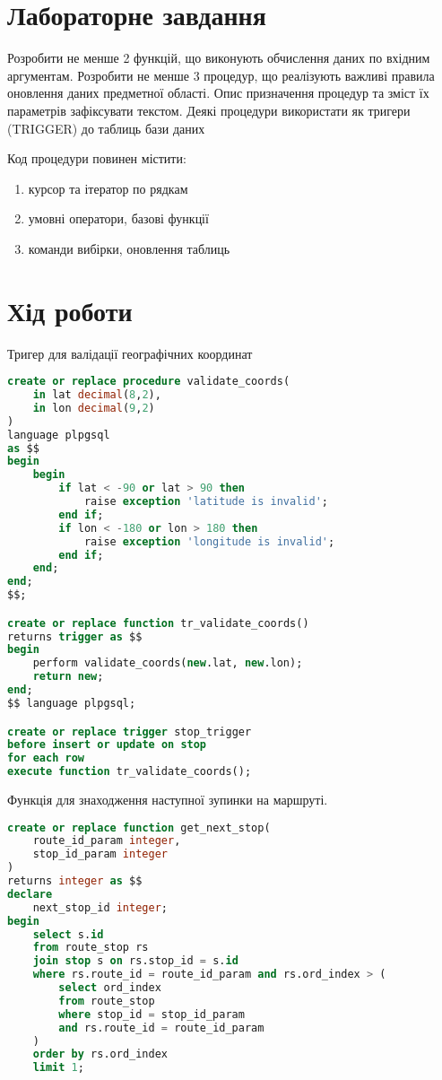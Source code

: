 \documentclass[14pt]{extreport}
\begin{document}
\begin{normalsize}
	\section*{Лабораторне завдання}
	Розробити не менше 2 функцій, що виконують обчислення даних по вхідним аргументам. Розробити не менше 3 процедур, що реалізують важливі правила оновлення даних предметної області. Опис призначення процедур та зміст їх параметрів зафіксувати текстом. Деякі процедури використати як тригери (TRIGGER) до таблиць бази даних
	
	Код процедури повинен містити:
	\begin{enumerate}
		\item курсор та ітератор по рядкам
		\item умовні оператори, базові функції 
		\item команди вибірки, оновлення таблиць
	\end{enumerate}
	
	\section*{Хід роботи}
	
	Тригер для валідації географічних координат
	
	\begin{small}
		\begin{lstlisting}[language=sql]
create or replace procedure validate_coords(
	in lat decimal(8,2),
	in lon decimal(9,2)
)
language plpgsql
as $$
begin
	begin
		if lat < -90 or lat > 90 then
			raise exception 'latitude is invalid';
		end if;
		if lon < -180 or lon > 180 then
			raise exception 'longitude is invalid';
		end if;
	end;
end;
$$;

create or replace function tr_validate_coords()
returns trigger as $$
begin
	perform validate_coords(new.lat, new.lon);
	return new;
end;
$$ language plpgsql;

create or replace trigger stop_trigger
before insert or update on stop
for each row
execute function tr_validate_coords();
		\end{lstlisting}
	\end{small}
	
	Функція для знаходження наступної зупинки на маршруті.
	
	\begin{small}
		\begin{lstlisting}[language=sql]
create or replace function get_next_stop(
	route_id_param integer,
	stop_id_param integer
)
returns integer as $$
declare
	next_stop_id integer;
begin
	select s.id
	from route_stop rs
	join stop s on rs.stop_id = s.id
	where rs.route_id = route_id_param and rs.ord_index > (
		select ord_index 
		from route_stop 
		where stop_id = stop_id_param 
		and rs.route_id = route_id_param
	)
	order by rs.ord_index
	limit 1;
	

\end{lstlisting}
\end{small}
\end{normalsize}
\end{document}
